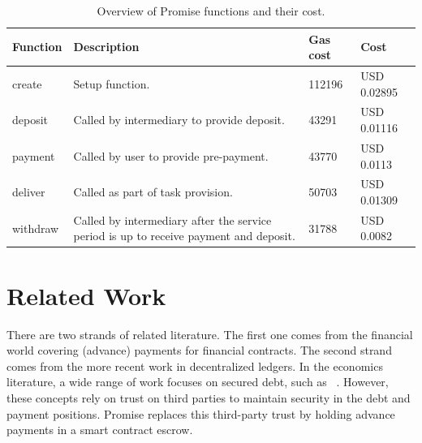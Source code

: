 \documentclass[runningheads]{llncs}
\newcommand{\sys}{Promise\xspace}
\newcommand{\tolgu}[1]{\todo[linecolor=yellow,backgroundcolor=yellow!25,bordercolor=yellow,inline,caption={}]{Todo for Lewis: #1}}
\begin{document}
\begin{table}[h]
\centering
\caption{Overview of \sys functions and their cost.}
\label{tab:implementation}
\begin{tabularx}{\textwidth}{lXll}
\toprule 
\textbf{Function} & \textbf{Description} & \textbf{Gas cost} & \textbf{Cost} \\ \toprule
create & Setup function. & 112196 & USD 0.02895 \\ 
deposit & Called by intermediary to provide deposit. & 43291 & USD 0.01116 \\
payment & Called by user to provide pre-payment. & 43770 & USD 0.0113 \\ \midrule
deliver & Called as part of task provision. & 50703 & USD 0.01309 \\ \midrule
withdraw & Called by intermediary after the service period is up to receive payment and deposit. & 31788 & USD 0.0082 \\
\bottomrule
\end{tabularx}
\end{table}




\section{Related Work}
\label{sec:related}




There are two strands of related literature.
The first one comes from the financial world covering (advance) payments for financial contracts.
The second strand comes from the more recent work in decentralized ledgers.
In the economics literature, a wide range of work focuses on secured debt, such as ~\cite{scott1977bankruptcy,stulz1985analysis}.
However, these concepts rely on trust on third parties to maintain security in the debt and payment positions.
\sys replaces this third-party trust by holding advance payments in a smart contract escrow.
\end{document}
